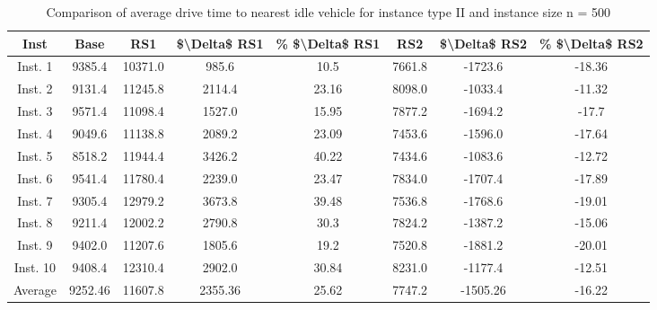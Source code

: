 \begin{table}[H]
\centering
\begin{tabular}{cccccccc}
  \hline
  \textbf{Inst} & \textbf{Base} & \textbf{RS1} & \textbf{\$\textbackslash{}Delta\$  RS1} & \textbf{\% \$\textbackslash{}Delta\$  RS1} & \textbf{RS2} & \textbf{\$\textbackslash{}Delta\$  RS2} & \textbf{\% \$\textbackslash{}Delta\$  RS2} \\\hline
  Inst. 1 & 9385.4 & 10371.0 & 985.6 & 10.5 & 7661.8 & -1723.6 & -18.36 \\
  Inst. 2 & 9131.4 & 11245.8 & 2114.4 & 23.16 & 8098.0 & -1033.4 & -11.32 \\
  Inst. 3 & 9571.4 & 11098.4 & 1527.0 & 15.95 & 7877.2 & -1694.2 & -17.7 \\
  Inst. 4 & 9049.6 & 11138.8 & 2089.2 & 23.09 & 7453.6 & -1596.0 & -17.64 \\
  Inst. 5 & 8518.2 & 11944.4 & 3426.2 & 40.22 & 7434.6 & -1083.6 & -12.72 \\
  Inst. 6 & 9541.4 & 11780.4 & 2239.0 & 23.47 & 7834.0 & -1707.4 & -17.89 \\
  Inst. 7 & 9305.4 & 12979.2 & 3673.8 & 39.48 & 7536.8 & -1768.6 & -19.01 \\
  Inst. 8 & 9211.4 & 12002.2 & 2790.8 & 30.3 & 7824.2 & -1387.2 & -15.06 \\
  Inst. 9 & 9402.0 & 11207.6 & 1805.6 & 19.2 & 7520.8 & -1881.2 & -20.01 \\
  Inst. 10 & 9408.4 & 12310.4 & 2902.0 & 30.84 & 8231.0 & -1177.4 & -12.51 \\
  Average & 9252.46 & 11607.8 & 2355.36 & 25.62 & 7747.2 & -1505.26 & -16.22 \\\hline
\end{tabular}
\caption{Comparison of average drive time to nearest idle vehicle for instance type II and instance size n = 500}
\label{tab:wait:resrelocation-nearest-drive-time-comparison_II_500}
\end{table}
